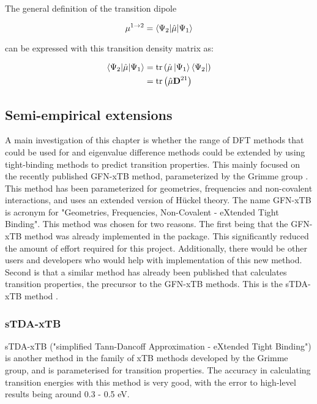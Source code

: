 The general definition of the transition dipole

\begin{equation}
\mathbf{\mu}^{1\rightarrow2} = \braket{\Psi_2|\hat{\mathbf{\mu}}|\Psi_1}
\end{equation}

can be expressed with this transition density matrix as:

\begin{equation}
\begin{split}    
\braket{\Psi_2|\hat{\mathbf{\mu}}|\Psi_1} &= \text{tr}\left(\hat{\mathbf{\mu}} \ket{\Psi_1} \bra{\Psi_2} \right) \\
&= \text{tr}\left( \hat{\mathbf{\mu}} \mathbf{D}^{21}\right)
\end{split}
\end{equation}

\subsection{Semi-empirical extensions}
\label{subsec:dscf_xtb}
A main investigation of this chapter is whether the range of DFT methods
that could be used for \dscf and eigenvalue difference methods could be extended 
by using tight-binding methods to predict transition properties.
This mainly focused on the recently published GFN-xTB method, parameterized by
the Grimme group \cite{Grimme2017}. This method has been parameterized for geometries,
frequencies and non-covalent interactions, and uses an extended version of H{\"u}ckel theory.
The name GFN-xTB is acronym for "Geometries, Frequencies, Non-Covalent - eXtended Tight Binding".
This method was chosen for two reasons. The first being that the GFN-xTB method was
already implemented in the  package. This significantly reduced the
amount of effort required for this project. Additionally, there would be other
users and developers who would help with implementation of this new method.
Second is that a similar method has already been published that calculates
transition properties, the precursor to the GFN-xTB methods. This is the sTDA-xTB
method \cite{Grimme2016}.

\subsubsection{sTDA-xTB}
\label{subsubsec:stda_xtb}
sTDA-xTB ("simplified Tann-Dancoff Approximation - eXtended Tight Binding") is another
method in the family of xTB methods developed by the Grimme group, and is parameterised
for transition properties. The accuracy in calculating transition energies with this
method is very good, with the error to high-level results being around 0.3 - 0.5 eV.

